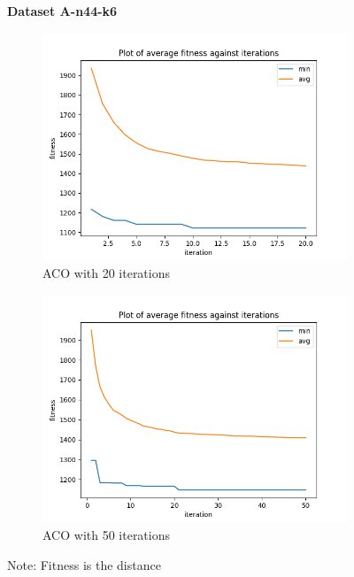 \documentclass{article}
\begin{document}
\begin{figure}[H]
  \centering
  \textbf{Dataset A-n44-k6}
  \begin{subfigure}{.5\textwidth}
    \centering
    \includegraphics[width=1\linewidth]{images/n44-k6_20.png}
    \caption{ACO with 20 iterations}
    \label{fig:n44-k6_20}
  \end{subfigure}%
  \begin{subfigure}{.5\textwidth}
    \centering
    \includegraphics[width=1\linewidth]{images/n44-k6_50.png}
    \caption{ACO with 50 iterations}
    \label{fig:n44-k6_50}
  \end{subfigure}
  \caption{Note: Fitness is the distance}
  \label{fig:n44-k6}
\end{figure}
\end{document}
